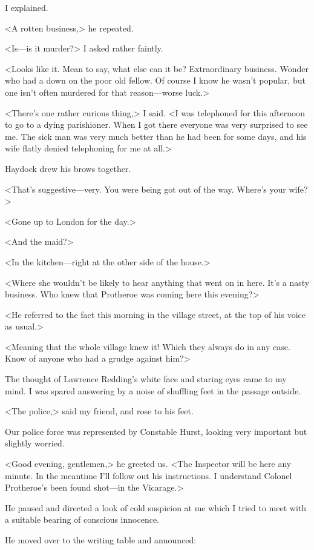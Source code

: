 I explained.

<A rotten business,> he repeated.

<Is—is it murder?> I asked rather faintly.

<Looks like it. Mean to say, what else can it be? Extraordinary business. Wonder who had a down on the poor old fellow. Of course I know he wasn't popular, but one isn't often murdered for that reason—worse luck.>

<There's one rather curious thing,> I said. <I was telephoned for this afternoon to go to a dying parishioner. When I got there everyone was very surprised to see me. The sick man was very much better than he had been for some days, and his wife flatly denied telephoning for me at all.>

Haydock drew his brows together.

<That's suggestive—very. You were being got out of the way. Where's your wife?>

<Gone up to London for the day.>

<And the maid?>

<In the kitchen—right at the other side of the house.>

<Where she wouldn't be likely to hear anything that went on in here. It's a nasty business. Who knew that Protheroe was coming here this evening?>

<He referred to the fact this morning in the village street, at the top of his voice as usual.>

<Meaning that the whole village knew it! Which they always do in any case. Know of anyone who had a grudge against him?>

The thought of Lawrence Redding's white face and staring eyes came to my mind. I was spared answering by a noise of shuffling feet in the passage outside.

<The police,> said my friend, and rose to his feet.

Our police force was represented by Constable Hurst, looking very important but slightly worried.

<Good evening, gentlemen,> he greeted us. <The Inspector will be here any minute. In the meantime I'll follow out his instructions. I understand Colonel Protheroe's been found shot—in the Vicarage.>

He paused and directed a look of cold suspicion at me which I tried to meet with a suitable bearing of conscious innocence.

He moved over to the writing table and announced:

